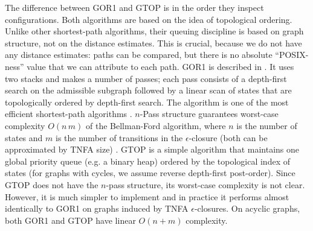 \documentclass[AMA,STIX1COL]{WileyNJD-v2}
\begin{document}
The difference between GOR1 and GTOP is in the order they inspect configurations.
%
Both algorithms are based on the idea of topological ordering.
Unlike other shortest-path algorithms, their queuing discipline is based on graph structure, not on the distance estimates.
This is crucial, because we do not have any distance estimates:
paths can be compared, but there is no absolute ``POSIX-ness'' value that we can attribute to each path.
%
GOR1 is described in \cite{GR93}.
It uses two stacks and makes a number of passes;
each pass consists of a depth-first search on the admissible subgraph
followed by a linear scan of states that are topologically ordered by depth-first search.
The algorithm is one of the most efficient shortest-path algorithms \cite{CGR96}.
$n$-Pass structure guarantees worst-case complexity $O(n \, m)$ of the Bellman-Ford algorithm,
where $n$ is the number of states and $m$ is the number of transitions in the $\epsilon$-closure
(both can be approximated by TNFA size) \cite{CGGTW09}.
%
GTOP is a simple algorithm that maintains one global priority queue (e.g. a binary heap)
ordered by the topological index of states (for graphs with cycles, we assume reverse depth-first post-order).
Since GTOP does not have the $n$-pass structure, its worst-case complexity is not clear.
However, it is much simpler to implement
and in practice it performs almost identically to GOR1 on graphs induced by TNFA $\epsilon$-closures.
%
On acyclic graphs, both GOR1 and GTOP have linear $O(n + m)$ complexity.
\\
\end{document}
